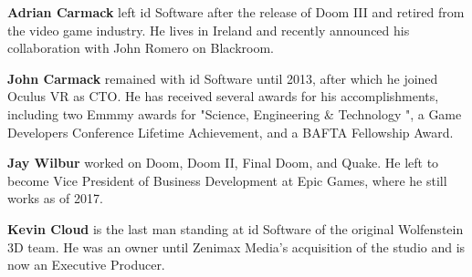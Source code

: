 \textbf{Adrian Carmack} left id Software after the release of Doom III and retired from the video game industry. He lives in Ireland and recently announced his collaboration with John Romero on Blackroom.\\
\par

\textbf{John Carmack} remained with id Software until 2013, after which he joined Oculus VR as CTO. He has received several awards for his accomplishments, including two Emmmy awards for "Science, Engineering \& Technology ", a Game Developers Conference Lifetime Achievement, and a BAFTA Fellowship Award.\\
\par
\textbf{Jay Wilbur} worked on Doom, Doom II, Final Doom, and Quake. He left to become Vice President of Business Development at Epic Games, where he still works as of 2017.\\
\par
\textbf{Kevin Cloud} is the last man standing at id Software of the original Wolfenstein 3D team. He was an owner until Zenimax Media's acquisition of the studio and is now an Executive Producer.
\par